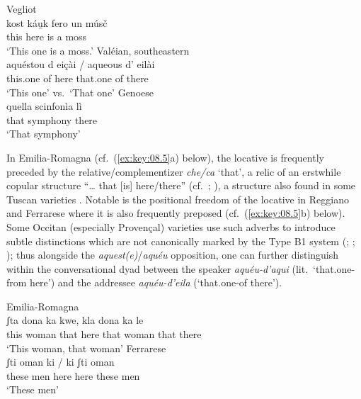 \documentclass[output=paper]{langsci/langscibook}
\begin{document}
\ea\label{bkm:Ref370498282}\label{ex:key:08.4}
\ea     Vegliot \citep{Bartoli:1906a}\\
\gll   kost  káu̯k  fero  un  músč\\
this  here  is  a  moss\\
\glt \enquote*{This one is a moss.}
\ex Valéian, southeastern  \citep{Arnaud:1920a}\\
\gll     aquéstou  d  eiçài \textup{\quad /\quad}  aqueous  d’  eilài\\
this.one  of  here {} that.one  of  there\\
\glt \enquote*{This one} vs.\ \enquote*{That one}
\ex Genoese \citep{Forner:1997a}\\
\gll    quella scinfonìa lì\\
that symphony there\\
\glt    \enquote*{That symphony}\\
\z
\z

In Emilia-Romagna (cf.\ (\ref{ex:key:08.5}a) below), the locative is frequently
preceded by the relative/complementizer \emph{che/ca} ‘that’, a relic of an
erstwhile copular structure \enquote{\dots{} that [is] here/there}
(cf.\ \citealt[206]{Rohlfs:1968a}; \citealt[581]{Foresti:1988a}), a structure
also found in some Tuscan varieties \citep[203]{Rohlfs:1968a}. Notable is the
positional freedom of the locative in Reggiano and Ferrarese where it is also
frequently preposed (cf.\ (\ref{ex:key:08.5}b) below). Some Occitan (especially
Provençal) varieties use such adverbs to introduce subtle distinctions which
are not canonically marked by the Type B1 system
(\citealt[88f]{Koschwitz:1894a}; \citealt[33]{Ronjat:1913a};
\citealt[65]{Salvat:1998a}); thus alongside the \emph{aquest(e)}/\emph{aquéu}
opposition, one can further distinguish within the conversational dyad between
the speaker \emph{aquéu-d’aqui} (lit.\ ‘that.one-from here’) and the addressee
\emph{aquéu-d’eila} (‘that.one-of there’).

\ea\label{bkm:Ref370498313}\label{ex:key:08.5}
\ea Emilia-Romagna \citep{Foresti:1988a}\\
\gll   ʃta  dona  ka  kwe,  kla  dona  ka  le\\
this  woman  that  here  that  woman  that  there\\
\glt \enquote*{This woman, that woman}
\ex Ferrarese \citep{Foresti:1988a}\\
\gll     ʃti  oman  ki   /  ki  ʃti  oman\\
these  men  here {} here  these  men\\
\glt \enquote*{These men}\z
\z
\end{document}
